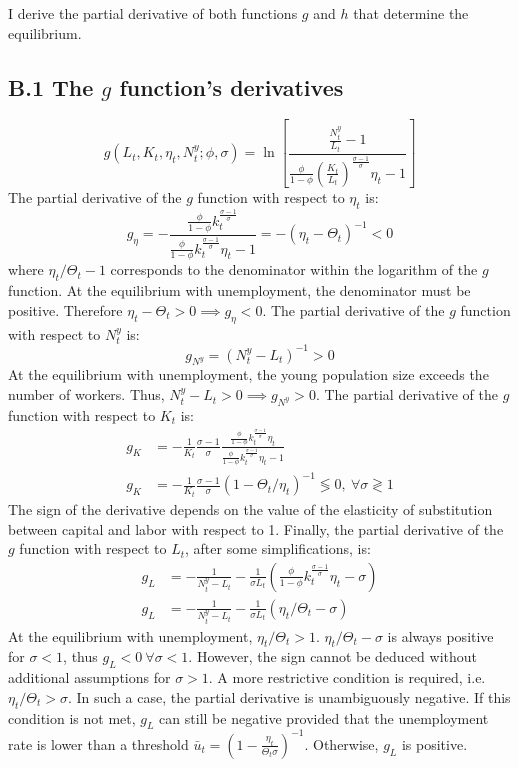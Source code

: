 I derive the partial derivative of both functions $g$ and $h$ that determine the equilibrium.

\subsection*{B.1 The $g$ function's derivatives}

\begin{equation*}
	g(L_t, K_t, \eta_t, N_t^y; \phi, \sigma) = 
	\ln\left[ \frac{ \frac{N_t^y}{L_t} - 1 } { \frac{\phi}{1-\phi} \left(\frac{K_t}{L_t}\right)^{\frac{\sigma-1}{\sigma}} \eta_t - 1 }\right]
\end{equation*}
The partial derivative of the $g$ function with respect to $\eta_t$ is:
\begin{equation*}
	g_\eta = - \frac{\frac{\phi}{1-\phi}k_t^{\frac{\sigma-1}{\sigma}}}{\frac{\phi}{1-\phi}k_t^{\frac{\sigma-1}{\sigma}}\eta_t - 1} = - \left(\eta_t - \Theta_t\right)^{-1} < 0
\end{equation*}
where $\eta_t/\Theta_t - 1$ corresponds to the denominator within the logarithm of the $g$ function. At the equilibrium with unemployment, the denominator must be positive. Therefore $\eta_t - \Theta_t >0 \implies g_\eta < 0$. The partial derivative of the $g$ function with respect to $N_t^y$ is:
\begin{equation*}
	g_{N^y} = \left(N_t^y-L_t\right)^{-1} > 0
\end{equation*}
At the equilibrium with unemployment, the young population size exceeds the number of workers. Thus, $N_t^y-L_t > 0 \implies g_{N^y} > 0$. The partial derivative of the $g$ function with respect to $K_t$ is:
\begin{align*}
	g_K &= -\frac{1}{K_t}\frac{\sigma - 1}{\sigma}\frac{\frac{\phi}{1-\phi}k_t^{\frac{\sigma-1}{\sigma}}\eta_t}{\frac{\phi}{1-\phi}k_t^{\frac{\sigma-1}{\sigma}}\eta_t - 1} \\
	g_K &= -\frac{1}{K_t}\frac{\sigma - 1}{\sigma}\left(1-\Theta_t/\eta_t\right)^{-1} \lessgtr 0,~\forall \sigma \gtrless 1
\end{align*}
The sign of the derivative depends on the value of the elasticity of substitution between capital and labor with respect to 1. Finally, the partial derivative of the $g$ function with respect to $L_t$, after some simplifications, is:
\begin{align*}
	g_L &= -\frac{1}{N_t^y-L_t} - \frac{1}{\sigma L_t} \left(\frac{\phi}{1-\phi}k_t^{\frac{\sigma-1}{\sigma}}\eta_t - \sigma\right) \\
	g_L &= -\frac{1}{N_t^y-L_t} - \frac{1}{\sigma L_t} \left(\eta_t/\Theta_t - \sigma\right)
\end{align*}
At the equilibrium with unemployment, $\eta_t/\Theta_t > 1$. $\eta_t/\Theta_t -\sigma$ is always positive for $\sigma < 1$, thus $g_L < 0~\forall \sigma < 1$. However, the sign cannot be deduced without additional assumptions for $\sigma > 1$. A more restrictive condition is required, i.e. $\eta_t/\Theta_t > \sigma$. In such a case, the partial derivative is unambiguously negative. If this condition is not met, $g_L$ can still be negative provided that the unemployment rate is lower than a threshold $\bar{u}_t = \left(1 - \frac{\eta_t}{\Theta_t \sigma}\right)^{-1}$. Otherwise, $g_L$ is positive.

